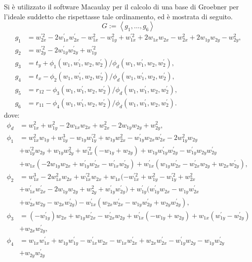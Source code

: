 Si è utilizzato il software Macaulay per il calcolo di una base di Groebner per l'ideale suddetto che rispettasse tale ordinamento, ed è mostrata di seguito.
\begin{equation}
	G := \left\langle g_1, \dots, g_6\right\rangle 
\end{equation}
\begin{align}
g_1 &= w_{2x}^{'2}-2w_{1x}^{'}w_{2x}^{'}-w_{1x}^2-w_{1y}^2+w_{1x}^{'2}+2w_{1x}w_{2x}-w_{2x}^2+2w_{1y}w_{2y}-w_{2y}^2,\\
g_2 &= w_{2y}^{'2}-2w_{1y}^{'}w_{2y}^{'}+w_{1y}^{'2}\\
g_3 &= t_y +\phi_1(w_1, w_1^{'}, w_2, w_2^{'})/\phi_d(w_1, w_1^{'}, w_2, w_2^{'}),\\
g_4 &= t_x - \phi_2(w_1, w_1^{'}, w_2, w_2^{'})/\phi_d(w_1, w_1^{'}, w_2, w_2^{'}),\\
g_5 &= r_{12} - \phi_3(w_1, w_1^{'}, w_2, w_2^{'})/\phi_d(w_1, w_1^{'}, w_2, w_2^{'}),\\
g_6 &= r_{11} - \phi_4(w_1, w_1^{'}, w_2, w_2^{'})/\phi_d(w_1, w_1^{'}, w_2, w_2^{'}).	
\end{align}
dove: 
\begin{align}
	\phi_d &= w_{1x}^2 + w_{1y}^2 - 2w_{1x}w_{2x} + w_{2x}^2 - 2w_{1y}w_{2y} + w_{2y}^2,\\ \nonumber
	\phi_1 & = w_{1x}^2w_{1y} + w_{1y}^3 - w_{1y}w_{1y}^{'2} + w_{1y}w_{2x}^2 - w_{1y}^{'}w_{2x}w_{2x}^{'} - 2w_{1y}^2w_{2y}\\& + w_{1y}^{'2}w_{2y} + w_{1y}w_{2y}^2 + w_{1x}^{'2}(-w_{1y} + w_{2y}) + w_{1y}w_{1y}^{'}w_{2y}^{'} - w_{1y}^{'}w_{2y}w_{2y}^{'} \\&+ w_{1x}(-2w_{1y}w_{2x} + w_{1y}^{'}w_{2x}^{'} - w_{1x}^{'}w_{2y}^{'}) + w_{1x}^{'}(w_{1y}w_{2x}^{'} - w_{2x}^{'}w_{2y} + w_{2x}w_{2y}^{'}), \nonumber\\
	\nonumber\phi_2 &= w_{1x}^3 - 2w_{1x}^2w_{2x} + w_{1x}^{'2}w_{2x} + w_{1x}(-w_{1x}^{'2} + w_{1y}^2 - w_{1y}^{'2} + w_{2x}^2\\& + w_{1x}^{'}w_{2x}^{'} - 2w_{1y}w_{2y} + w_{2y}^2 + w_{1y}^{'}w_{2y}^{'}) + w_{1y}^{'}(w_{1y}^{'}w_{2x} - w_{1y}w_{2x}^{'} \\& \nonumber+ w_{2x}^{'}w_{2y} - w_{2x}w_{2y}^{'}) - w_{1x}^{'}(w_{2x}w_{2x}^{'} - w_{1y}w_{2y}^{'} + w_{2y}w_{2y}^{'}),\\\nonumber
	\phi_3 &= (-w_{1y}^{'})w_{2x} + w_{1y}w_{2x}^{'} - w_{2x}^{'}w_{2y} + w_{1x}^{'}(-w_{1y} + w_{2y}) + w_{1x}(w_{1y}^{'} - w_{2y}^{'})\\& + w_{2x}w_{2y}^{'},\\ \nonumber
	\phi_4 &= w_{1x}w_{1x}^{'} + w_{1y}w_{1y}^{'} - w_{1x}^{'}w_{2x} - w_{1x}w_{2x}^{'} + w_{2x}w_{2x}^{'} - w_{1y}^{'}w_{2y} - w_{1y}w_{2y}^{'}\\& + w_{2y}w_{2y}^{'}
\end{align}


